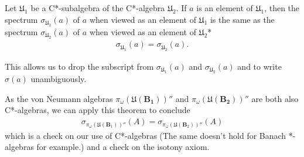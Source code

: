\begin{theorem}
    Let $\mathfrak{U}_1$ be a C*-subalgebra of the C*-algebra $\mathfrak{U}_2$. If $a$ is an element of $\mathfrak{U}_1$, then the spectrum $\sigma_{\mathfrak{U}_1}(a)$ of $a$ when viewed as an element of $\mathfrak{U}_1$ is the same as the spectrum $\sigma_{\mathfrak{U}_2}(a)$ of $a$ when viewed as an element of $\mathfrak{U}_2$*
    \begin{align}
        \sigma_{\mathfrak{U}_1}(a) = \sigma_{\mathfrak{U}_2}(a).
    \end{align}
\end{theorem}
\noindent This allows us to drop the subscript from $\sigma_{\mathfrak{U}_1}(a)$ and $\sigma_{\mathfrak{U}_2}(a)$ and to write $\sigma(a)$ unambiguously.

As the von Neumann algebras $\pi_{\omega}(\mathfrak{U}(\mathbf{B_1}))''$ and $\pi_{\omega}(\mathfrak{U}(\mathbf{B_2}))''$ are both also C*-algebras, we can apply this theorem to conclude
\begin{align}
    \sigma_{\pi_\omega(\mathfrak{U}(\mathbf{B}_1))''}(A) = \sigma_{\pi_\omega(\mathfrak{U}(\mathbf{B}_2))''}(A)
\end{align}
which is a check on our use of C*-algebras (The same doesn't hold for Banach *-algebras for example.) and a check on the isotony axiom.
